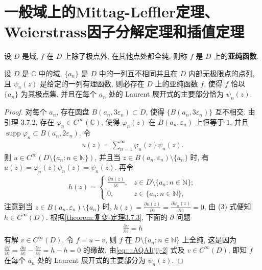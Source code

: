 \documentclass[../../main.tex]{subfiles}%
\begin{document}
\section{一般域上的Mittag-Leffler定理、Weierstrass因子分解定理和插值定理}

\begin{definition}
设 \(D\) 是域, \(f\) 在 \(D\) 上除了极点外, 在其他点处都全纯, 则称 \(f\) 是 \(D\) 上的\textbf{亚纯函数}.
\end{definition}

\begin{theorem}\label{theorem:Mittag-Leffler定理}
设 \(D\) 是 \(\mathbb{C}\) 中的域, \(\{a_n\}\) 是 \(D\) 中的一列互不相同并且在 \(D\) 内部无极限点的点列, 且 \(\psi_n(z)\) 是给定的一列有理函数, 则必存在 \(D\) 上的亚纯函数 \(f\), 使得 \(f\) 恰以 \(\{a_n\}\) 为其极点集, 并且在每个 \(a_n\) 处的 Laurent 展开式的主要部分恰为 \(\psi_n(z)\).
\end{theorem}
\begin{proof}
对每个 \(a_n\), 存在圆盘 \(B(a_n,3\varepsilon_n)\subset D\), 使得 \(\{B(a_n,3\varepsilon_n)\}\) 互不相交. 由引理 3.7.2, 存在 \(\varphi_n \in C^\infty(\mathbb{C})\), 使得 \(\varphi_n(z)\) 在 \(B(a_n,\varepsilon_n)\) 上恒等于 \(1\), 并且 \(\operatorname{supp}\varphi_n \subset B(a_n,2\varepsilon_n)\). 令
\begin{align*}
u(z) = \sum\limits_{n=1}^\infty \varphi_n(z)\psi_n(z).
\end{align*}
则 \(u \in C^\infty(D \setminus \{a_n: n \in \mathbb{N}\})\), 并且当 \(z \in B(a_n,\varepsilon_n) \setminus \{a_n\}\) 时, 有 \(u(z) = \varphi_n(z)\psi_n(z) = \psi_n(z)\). 再令
\begin{align}\label{eq::::AQAIijij-2}
h(z) = \begin{cases}
\frac{\partial u(z)}{\partial \overline{z}}, & z \in D \setminus \{a_n: n \in \mathbb{N}\}; \\
0, & z \in \{a_n: n \in \mathbb{N}\},
\end{cases}
\end{align}
注意到当 \(z \in B(a_n,\varepsilon_n) \setminus \{a_n\}\) 时, \(h(z) = \frac{\partial u(z)}{\partial \overline{z}} = \frac{\partial \psi_n(z)}{\partial \overline{z}} = 0\), 由 (3) 式便知 \(h \in C^\infty(D)\). 根据\cref{theorem:复变-定理3.7.3}, 下面的 \(\overline{\partial}\) 问题
\begin{align*}
\frac{\partial v}{\partial \overline{z}} = h
\end{align*}
有解 \(v \in C^\infty(D)\). 令 \(f = u - v\), 则 \(f\) 在 \(D \setminus \{a_n: n \in \mathbb{N}\}\) 上全纯, 这是因为 \(\frac{\partial f}{\partial \overline{z}} = \frac{\partial u}{\partial \overline{z}} - \frac{\partial v}{\partial \overline{z}} = h - h = 0\) 的缘故. 由\eqref{eq::::AQAIijij-2} 式及 \(v \in C^\infty(D)\), 即知 \(f\) 在每个 \(a_n\) 处的 Laurent 展开式的主要部分为 \(\psi_n(z)\).
\end{proof}
\end{document}
